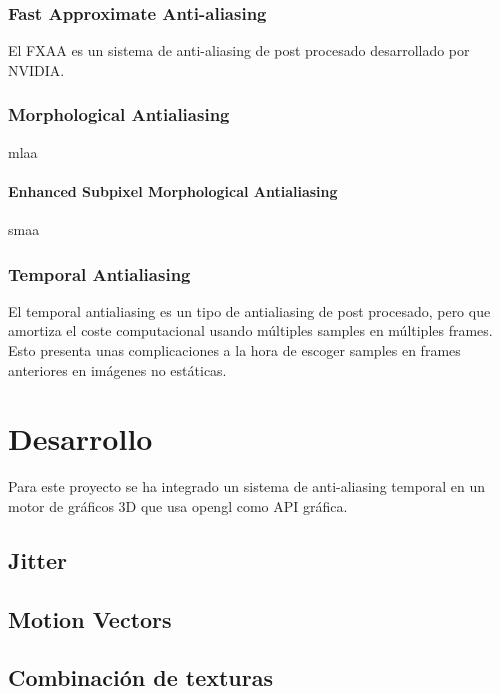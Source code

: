 \documentclass[withindex, glossary]{cam-thesis}
\begin{document}
\subsection{Fast Approximate Anti-aliasing}

El FXAA\cite{FXAA} es un sistema de anti-aliasing de post procesado desarrollado por NVIDIA\@.

\subsection{Morphological Antialiasing}
mlaa

\subsubsection{Enhanced Subpixel Morphological Antialiasing}
smaa

\subsection{Temporal Antialiasing}

El temporal antialiasing es un tipo de antialiasing de post procesado, pero que amortiza el coste computacional usando múltiples samples en múltiples frames. Esto presenta unas complicaciones a la hora de escoger samples en frames anteriores en imágenes no estáticas.

\chapter{Desarrollo}

Para este proyecto se ha integrado un sistema de anti-aliasing temporal en un motor de gráficos 3D que usa \Gls{opengl} como API gráfica.

\section{Jitter}

\section{Motion Vectors}

\section{Combinación de texturas}
\end{document}
